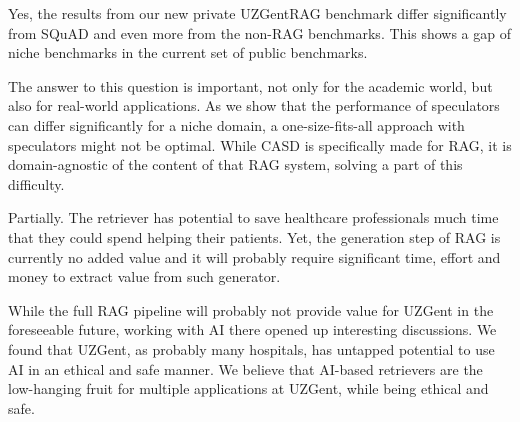 \begin{tcolorbox}[colback=blue-ish-light,colframe=blue-ish,title=\textbf{RQ2:} Does a real-world benchmark in a niche domain show significantly different results from existing speculative decoding benchmarks?, coltitle=white]
    Yes, the results from our new private UZGentRAG benchmark differ significantly from SQuAD and even more from the non-RAG benchmarks. This shows a gap of niche benchmarks in the current set of public benchmarks.
\end{tcolorbox}

The answer to this question is important, not only for the academic world, but also for real-world applications. As we show that the performance of speculators can differ significantly for a niche domain, a one-size-fits-all approach with speculators might not be optimal. While CASD is specifically made for RAG, it is domain-agnostic of the content of that RAG system, solving a part of this difficulty.

\begin{tcolorbox}[colback=blue-ish-light,colframe=blue-ish,title=\textbf{RQ3:} Can a RAG system provide additional value at UZGent?, coltitle=white]
    Partially. The retriever has potential to save healthcare professionals much time that they could spend helping their patients. Yet, the generation step of RAG is currently no added value and it will probably require significant time, effort and money to extract value from such generator.
\end{tcolorbox}

While the full RAG pipeline will probably not provide value for UZGent in the foreseeable future, working with AI there opened up interesting discussions. We found that UZGent, as probably many hospitals, has untapped potential to use AI in an ethical and safe manner. We believe that AI-based retrievers are the low-hanging fruit for multiple applications at UZGent, while being ethical and safe.


